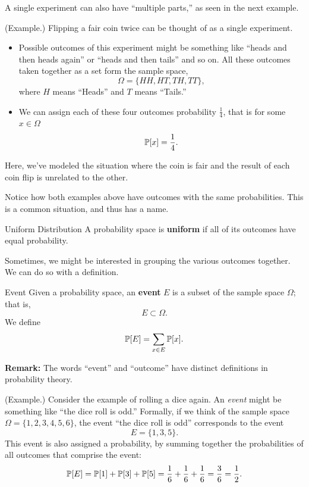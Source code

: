 \documentclass[letterpaper]{article}
\begin{document}
A single experiment can also have ``multiple parts,'' as seen in the next example. 
\begin{mdframed}
    (Example.) Flipping a fair coin twice can be thought of as a single experiment. 
    \begin{itemize}
        \item Possible outcomes of this experiment might be something like ``heads and then heads again'' or ``heads and then tails'' and so on. All these outcomes taken together as a set form the sample space, 
        \[\Omega = \{HH, HT, TH, TT\},\]
        where $H$ means ``Heads'' and $T$ means ``Tails.''

        \item We can assign each of these four outcomes probability $\frac{1}{4}$, that is for some $x \in \Omega$
        \[\mathbb{P}[x] = \frac{1}{4}.\]
    \end{itemize}
    Here, we've modeled the situation where the coin is fair and the result of each coin flip is unrelated to the other. 
\end{mdframed}
Notice how both examples above have outcomes with the same probabilities. This is a common situation, and thus has a name.

\begin{definition}{Uniform Distribution}{}
    A probability space is \textbf{uniform} if all of its outcomes have equal probability. 
\end{definition}
Sometimes, we might be interested in grouping the various outcomes together. We can do so with a definition.

\begin{definition}{Event}{}
    Given a probability space, an \textbf{event} $E$ is a subset of the sample space $\Omega$; that is, 
    \[E \subset \Omega.\]
    We define 
    \[\mathbb{P}[E] = \sum_{x \in E} \mathbb{P}[x].\]
\end{definition}
\textbf{Remark:} The words ``event'' and ``outcome'' have distinct definitions in probability theory.

\begin{mdframed}
    (Example.) Consider the example of rolling a dice again. An \emph{event} might be something like ``the dice roll is odd.'' Formally, if we think of the sample space $\Omega = \{1, 2, 3, 4, 5, 6\}$, the event ``the dice roll is odd'' corresponds to the event \[E = \{1, 3, 5\}.\] This event is also assigned a probability, by summing together the probabilities of all outcomes that comprise the event:
    \[\mathbb{P}[E] = \mathbb{P}[1] + \mathbb{P}[3] + \mathbb{P}[5] = \frac{1}{6} + \frac{1}{6} + \frac{1}{6} = \frac{3}{6} = \frac{1}{2}.\]
\end{mdframed}
\end{document}
